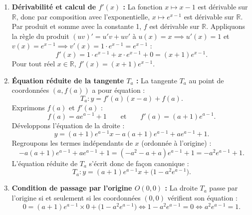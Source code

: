 \documentclass[11pt,a4paper]{article}
\newcommand{\R}{\mathbb{R}}
\begin{document}
\begin{correctionbox}[Exercice 5]
\begin{enumerate}[label=\textbf{\arabic*.}]
    \item \textbf{Dérivabilité et calcul de $f'(x)$ :}
    La fonction $x \mapsto x-1$ est dérivable sur $\R$, donc par composition avec l'exponentielle, $x \mapsto e^{x-1}$ est dérivable sur $\R$.
    Par produit et somme avec la constante 1, $f$ est dérivable sur $\R$.
    Appliquons la règle du produit $(uv)' = u'v + uv'$ à $u(x) = x \implies u'(x) = 1$ et $v(x) = e^{x-1} \implies v'(x) = 1 \cdot e^{x-1} = e^{x-1}$ :
    \[
    f'(x) = 1 \cdot e^{x-1} + x \cdot e^{x-1} + 0 = (x+1)e^{x-1}.
    \]
    Pour tout réel $x \in \R$, $\boxed{f'(x) = (x+1)e^{x-1}}$.

    \item \textbf{Équation réduite de la tangente $T_a$ :}
    La tangente $T_a$ au point de coordonnées $(a, f(a))$ a pour équation :
    \[
    T_a : y = f'(a)(x - a) + f(a).
    \]
    Exprimons $f(a)$ et $f'(a)$ :
    \[
    f(a) = a e^{a-1} + 1 \qquad \text{et} \qquad f'(a) = (a+1)e^{a-1}.
    \]
    Développons l'équation de la droite :
    \[
    y = (a+1)e^{a-1} x - a(a+1)e^{a-1} + a e^{a-1} + 1.
    \]
    Regroupons les termes indépendants de $x$ (ordonnée à l'origine) :
    \[
    - a(a+1)e^{a-1} + a e^{a-1} + 1 = (-a^2 - a + a)e^{a-1} + 1 = -a^2 e^{a-1} + 1.
    \]
    L'équation réduite de $T_a$ s'écrit donc de façon canonique :
    \[
    \boxed{T_a : y = (a+1)e^{a-1} x + \bigl(1 - a^2 e^{a-1}\bigr)}.
    \]

    \item \textbf{Condition de passage par l'origine $O(0, 0)$ :}
    La droite $T_a$ passe par l'origine si et seulement si les coordonnées $(0, 0)$ vérifient son équation :
    \[
    0 = (a+1)e^{a-1} \times 0 + \bigl(1 - a^2 e^{a-1}\bigr) \iff 1 - a^2 e^{a-1} = 0 \iff a^2 e^{a-1} = 1.
    \]


\end{enumerate}
\end{correctionbox}
\end{document}

